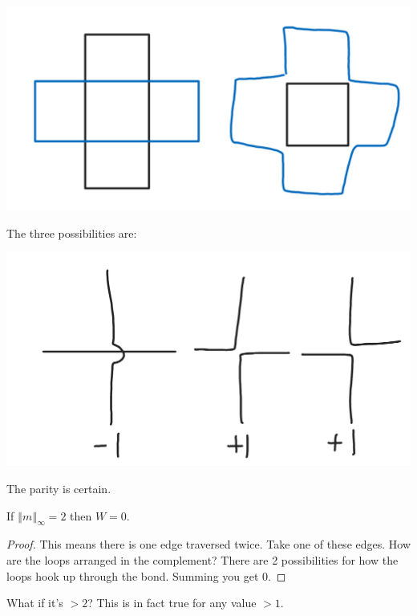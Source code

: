 \begin{center}\includegraphics[scale=.25]{images/12-2}\end{center}

The three possibilities are:

\begin{center}\includegraphics[scale=.25]{images/12-3}\end{center}

The parity is certain. 

\begin{lemma}
If $\left\Vert {m}\right\Vert_{\infty}=2$ then $W=0$.
\end{lemma}
\begin{proof}
This means there is one edge traversed twice. Take one of these edges. How are the loops arranged in the complement? There are 2 possibilities for how the loops hook up through the bond. Summing you get 0.
\end{proof}
What if it's $>2$? This is in fact true for any value $>1$.

